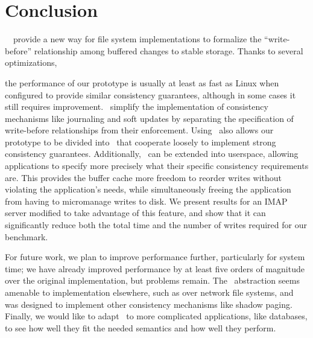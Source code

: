\section{Conclusion}
\label{sec:conclusion}

\Kudos\ \patches\ provide a new way for file system implementations to formalize
the ``write-before'' relationship among buffered changes to stable storage.
%
Thanks to several optimizations,
\begin{comment}
which significantly decrease the overhead
required to use \patches, both in terms of the amount of memory required and the
CPU time spent.
%
We evaluate a prototype file system implementation using \patches\ to determine
whether these ideas can be used in production file systems.
%
\end{comment}
the
performance of our prototype is usually at least as fast as Linux when
configured to provide similar consistency guarantees, although in some cases it
still requires improvement.
%
\Patches\ simplify the implementation of consistency mechanisms like journaling
and soft updates by separating the specification of write-before
relationships from their enforcement.
%
Using \patches\ also allows our prototype to be divided into \modules\ that
cooperate loosely to implement strong consistency guarantees.
%
Additionally, \patches\ can be extended into userspace, allowing applications to
specify more precisely what their specific consistency requirements are.
%
This provides the buffer cache more freedom to reorder writes without violating
the application's needs, while simultaneously freeing the application from
having to micromanage writes to disk.
%
We present results for an IMAP server modified to take advantage of this
feature, and show that it can significantly reduce both the total time and the
number of writes required for our benchmark.


For future work, we plan to improve performance further, particularly for
system time; %
%
we have already improved performance by at least five orders of magnitude
over the original implementation, but problems remain.
%
The \patch\ abstraction seems amenable to implementation elsewhere,
such as over network file systems, and was designed to implement other consistency
mechanisms like shadow paging.
%
Finally, we would like to adapt \patchgroups\ to more complicated
applications, like databases, to see how well they fit the needed semantics and
how well they perform.

